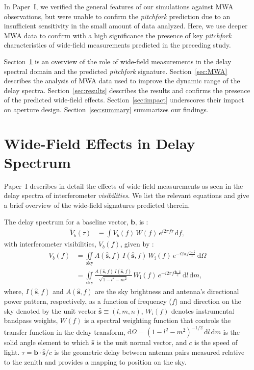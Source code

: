 \documentclass[preprint2,apjl,numberedappendix,twocolappendix,appendixfloats]{emulateapj}
\newcommand{\dif}{\mathrm{d}}
\begin{document}
In Paper~I, we verified the general features of our simulations against MWA observations, but were unable to confirm the {\it pitchfork} prediction due to an insufficient sensitivity in the small amount of data analyzed. Here, we use deeper MWA data to confirm with a high significance the presence of key {\it pitchfork} characteristics of wide-field measurements predicted in the preceding study.  

Section~\ref{sec:wide-field} is an overview of the role of wide-field measurements in the delay spectral domain and the predicted {\it pitchfork} signature. Section~\ref{sec:MWA} describes the analysis of MWA data used to improve the dynamic range of the delay spectra. Section~\ref{sec:results} describes the results and confirms the presence of the predicted wide-field effects. Section~\ref{sec:impact} underscores their impact on aperture design. Section~\ref{sec:summary} summarizes our findings.

\section{Wide-Field Effects in Delay Spectrum}\label{sec:wide-field}

Paper~I describes in detail the effects of wide-field measurements as seen in the delay spectra of interferometer {\it visibilities}. We list the relevant equations and give a brief overview of the wide-field signatures predicted therein. 

The delay spectrum for a baseline vector, $\boldsymbol{b}$, is \citep[][Paper~I]{par12a,par12b,thy13}: 
\begin{align}\label{eqn:delay-spectrum}
  \widetilde{V}_b(\tau) &\equiv \int V_b(f)\,W(f)\,e^{i2\pi f\tau}\,\dif f,
\end{align}
with interferometer visibilities, $V_b(f)$, given by \citep{van34,zer38,tho01}:
\begin{align} 
  V_b(f) &= \iint\limits_\textrm{sky} A(\hat{\boldsymbol{s}},f)\,I(\hat{\boldsymbol{s}},f)\,W_\textrm{i}(f)\,e^{-i2\pi f\frac{\boldsymbol{b}\cdot\hat{\boldsymbol{s}}}{c}}\,\dif\Omega \label{eqn:vis1}\\
         &= \iint\limits_\textrm{sky} \frac{A(\hat{\boldsymbol{s}},f)\,I(\hat{\boldsymbol{s}},f)}{\sqrt{1-l^2-m^2}}\,W_\textrm{i}(f)\,e^{-i2\pi f\frac{\boldsymbol{b}\cdot\hat{\boldsymbol{s}}}{c}}\,\dif l\,\dif m, \label{eqn:vis2}
\end{align}
where, $I(\hat{\boldsymbol{s}},f)$ and $A(\hat{\boldsymbol{s}},f)$ are the sky brightness and antenna's directional power pattern, respectively, as a function of frequency ($f$) and direction on the sky denoted by the unit vector $\hat{\boldsymbol{s}}\equiv (l,m,n)$, $W_\textrm{i}(f)$ denotes instrumental bandpass weights, $W(f)$ is a spectral weighting function that controls the transfer function in the delay transform, $\dif\Omega=(1-l^2-m^2)^{-1/2}\,\dif l\,\dif m$ is the solid angle element to which $\hat{\boldsymbol{s}}$ is the unit normal vector, and $c$ is the speed of light. $\tau=\boldsymbol{b}\cdot\hat{\boldsymbol{s}}/c$ is the geometric delay between antenna pairs measured relative to the zenith and provides a mapping to position on the sky.
\end{document}
